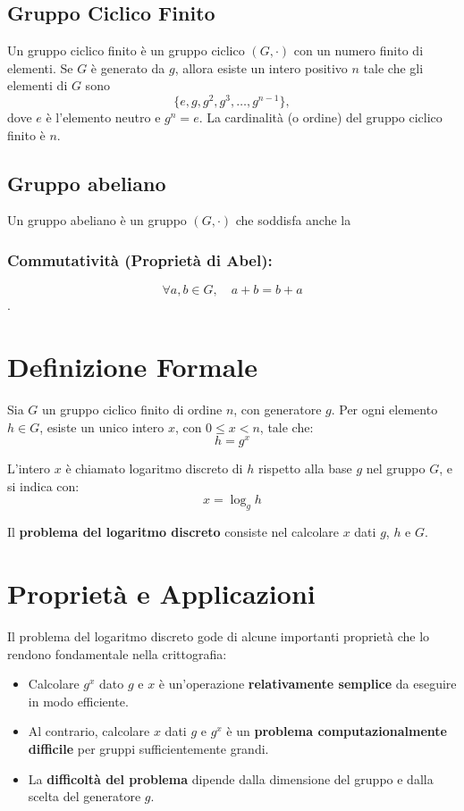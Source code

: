 \documentclass[a4paper,12pt]{report}
\begin{document}
\subsection*{Gruppo Ciclico Finito}

Un gruppo ciclico finito è un gruppo ciclico \( (G, \cdot) \) con un numero finito di elementi. Se \( G \) è generato da \( g \), allora esiste un intero positivo \( n \) tale che gli elementi di \( G \) sono
\[\{e, g, g^2, g^3, \ldots, g^{n-1}\},\]
dove \( e \) è l'elemento neutro e \( g^n = e \). La cardinalità (o ordine) del gruppo ciclico finito è \( n \).

\subsection*{Gruppo abeliano}
Un gruppo abeliano è un gruppo \( (G, \cdot) \) che soddisfa anche la 
\subsubsection*{Commutatività (Proprietà di Abel):} \[ \forall a, b \in  G, \quad a + b = b + a \].


\section{Definizione Formale}
Sia $G$ un gruppo ciclico finito di ordine $n$, con generatore $g$. Per ogni elemento $h \in G$, esiste un unico intero $x$, con $0 \leq x < n$, tale che:
\[h = g^x\]

L'intero $x$ è chiamato logaritmo discreto di $h$ rispetto alla base $g$ nel gruppo $G$, e si indica con:
\[x = \log_g h\]

Il \textbf{problema del logaritmo discreto} consiste nel calcolare $x$ dati $g$, $h$ e $G$. 

\section{Proprietà e Applicazioni}
Il problema del logaritmo discreto gode di alcune importanti proprietà che lo rendono fondamentale nella crittografia:

\begin{itemize}
    \item Calcolare $g^x$ dato $g$ e $x$ è un'operazione \textbf{relativamente semplice }da eseguire in modo efficiente.
    \item Al contrario, calcolare $x$ dati $g$ e $g^x$ è un \textbf{problema computazionalmente difficile} per gruppi sufficientemente grandi.
    \item La \textbf{difficoltà del problema} dipende dalla dimensione del gruppo e dalla scelta del generatore $g$.
\end{itemize}
\end{document}
